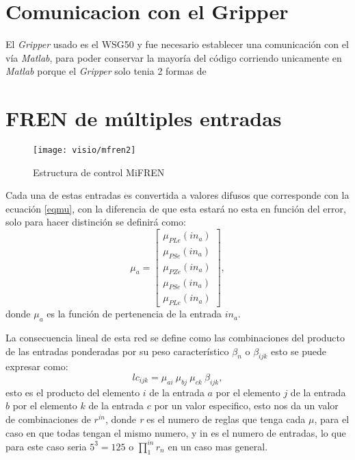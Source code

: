     \section{Comunicacion con el Gripper}
    
	El \textit{Gripper} usado es el WSG50 y fue necesario establecer una comunicación con el vía \textit{Matlab}, para poder conservar la mayoría del código corriendo unicamente en \textit{Matlab} porque el \textit{Gripper} solo tenia 2 formas de 
    
    \section{FREN de múltiples entradas}
    
    \begin{figure}[h]
    	\centering
    	\texttt{[image: visio/mfren2]}
    	\caption{Estructura de control MiFREN}
    	\label{fig:mfren2}
    \end{figure}
    
    Cada una de estas entradas es convertida a valores difusos que corresponde con la ecuación \ref{eqmu}, con la diferencia de que esta estará no esta en función del error, solo para hacer distinción se definirá como:
    \begin{equation}
    \label{eqmmu}
    \mu_a=\begin{bmatrix}
    	\mu_{PLe}(in_a) \\ 
    	\mu_{PSe}(in_a)\\ 
    	\mu_{PZe}(in_a)\\ 
    	\mu_{PSe}(in_a)\\ 
    	\mu_{PLe}(in_a)
    \end{bmatrix}  ,
\end{equation}
    donde $\mu_a$ es la función de pertenencia de la entrada $in_a$.
    
    La consecuencia lineal de esta red se define como las combinaciones del producto de las entradas ponderadas por su peso característico $\beta_n$ o $\beta_{ijk}$
    esto se puede expresar como: \begin{equation}
    lc_{ijk}=\mu_{ai}\ \mu_{bj} \ \mu_{ck} \ \beta_{ijk},
    \end{equation}
    esto es el producto del elemento $i$ de la entrada $a$ por el elemento $j$ de la entrada $b$ por el elemento $k$ de la entrada $c$ por un valor especifico, esto nos da un valor de combinaciones de $r^{in}$, donde \textit{r} es el numero de reglas que tenga cada $\mu$, para el caso en que todas tengan el mismo numero, y in es el numero de entradas, lo que para este caso seria $5^3 = 125$ o $\prod_{1}^{in} r_n$
    en un caso mas general.
    

